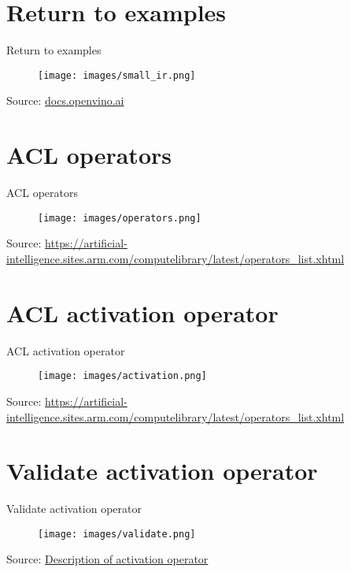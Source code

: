 \documentclass{beamer}
\begin{document}
\section{Return to examples}
\begin{frame}{Return to examples}
  \begin{figure}[h]
    \texttt{[image: images/small\_ir.png]}
  \end{figure}
  \footnotesize Source: \href{https://docs.openvino.ai/}{docs.openvino.ai}
\end{frame}

\section{ACL operators}
\begin{frame}{ACL operators}
  \begin{figure}[h]
    \texttt{[image: images/operators.png]}
  \end{figure}
  \footnotesize Source: \href{https://artificial-intelligence.sites.arm.com/computelibrary/latest/operators_list.xhtml}{https://artificial-intelligence.sites.arm.com/computelibrary/latest/operators\_list.xhtml}
\end{frame}

\section{ACL activation operator}
\begin{frame}{ACL activation operator}
  \begin{figure}[h]
    \texttt{[image: images/activation.png]}
  \end{figure}
  \footnotesize Source: \href{https://artificial-intelligence.sites.arm.com/computelibrary/latest/operators_list.xhtml}{https://artificial-intelligence.sites.arm.com/computelibrary/latest/operators\_list.xhtml}
\end{frame}

\section{Validate activation operator}
\begin{frame}{Validate activation operator}
  \begin{figure}[h]
    \texttt{[image: images/validate.png]}
  \end{figure}
  \footnotesize Source: \href{https://artificial-intelligence.sites.arm.com/computelibrary/latest/classarm__compute_1_1_n_e_activation_layer.xhtml}{Description of activation operator}
\end{frame}
\end{document}
